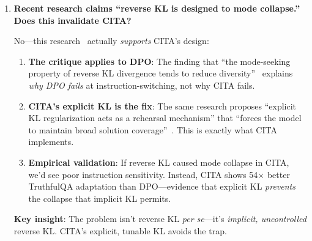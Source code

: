 \begin{enumerate}[label=\textbf{Q\arabic*.}, leftmargin=*, itemsep=8pt]
This decoupling is why CITA achieves 95.6\% instruction-alignment efficiency while DPO achieves only 70.5\%---a 25.1 pp gap explained entirely by KL architecture.

\vspace{4mm}

\item \textbf{Recent research claims ``reverse KL is designed to mode collapse.'' Does this invalidate CITA?}

 No---this research~\cite{liu2024kl,goyal2024beyond} actually \textit{supports} CITA's design:

\begin{enumerate}[leftmargin=*,itemsep=2pt]
    \item \textbf{The critique applies to DPO}: The finding that ``the mode-seeking property of reverse KL divergence tends to reduce diversity''~\cite{goyal2024beyond} explains \textit{why DPO fails} at instruction-switching, not why CITA fails.

    \item \textbf{CITA's explicit KL is the fix}: The same research proposes ``explicit KL regularization acts as a rehearsal mechanism'' that ``forces the model to maintain broad solution coverage''~\cite{wang2024comprehensive}. This is exactly what CITA implements.

    \item \textbf{Empirical validation}: If reverse KL caused mode collapse in CITA, we'd see poor instruction sensitivity. Instead, CITA shows 54$\times$ better TruthfulQA adaptation than DPO---evidence that explicit KL \textit{prevents} the collapse that implicit KL permits.
\end{enumerate}

\textbf{Key insight}: The problem isn't reverse KL \textit{per se}---it's \textit{implicit, uncontrolled} reverse KL. CITA's explicit, tunable KL avoids the trap.

\end{enumerate}

\twocolumn
